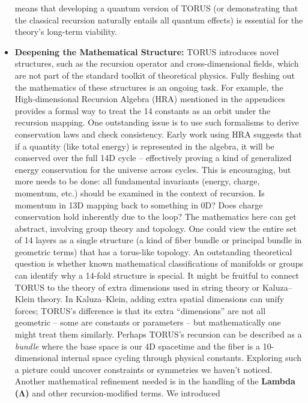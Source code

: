 \documentclass[
]{article}
\begin{document}
\begin{itemize}
  means that developing a quantum version of TORUS (or demonstrating
  that the classical recursion naturally entails all quantum effects) is
  essential for the theory's long-term viability.
\item
  \textbf{Deepening the Mathematical Structure:} TORUS introduces novel
  structures, such as the recursion operator and cross-dimensional
  fields, which are not part of the standard toolkit of theoretical
  physics. Fully fleshing out the mathematics of these structures is an
  ongoing task. For example, the High-dimensional Recursion Algebra
  (HRA) mentioned in the appendices provides a formal way to treat the
  14 constants as an orbit under the recursion mapping\hspace{0pt}. One
  outstanding issue is to use such formalisms to derive conservation
  laws and check consistency. Early work using HRA suggests that if a
  quantity (like total energy) is represented in the algebra, it will be
  conserved over the full 14D cycle\hspace{0pt} -- effectively proving a
  kind of generalized energy conservation for the universe across
  cycles. This is encouraging, but more needs to be done: all
  fundamental invariants (energy, charge, momentum, etc.) should be
  examined in the context of recursion. Is momentum in 13D mapping back
  to something in 0D? Does charge conservation hold inherently due to
  the loop? The mathematics here can get abstract, involving group
  theory and topology. One could view the entire set of 14 layers as a
  single structure (a kind of fiber bundle or principal bundle in
  geometric terms) that has a torus-like topology. An outstanding
  theoretical question is whether known mathematical classifications of
  manifolds or groups can identify why a 14-fold structure is special.
  It might be fruitful to connect TORUS to the theory of extra
  dimensions used in string theory or Kaluza--Klein theory. In
  Kaluza--Klein, adding extra spatial dimensions can unify forces;
  TORUS's difference is that its extra ``dimensions'' are not all
  geometric -- some are constants or parameters -- but mathematically
  one might treat them similarly. Perhaps TORUS's recursion can be
  described as a \emph{bundle} where the base space is our 4D spacetime
  and the fiber is a 10-dimensional internal space cycling through
  physical constants. Exploring such a picture could uncover constraints
  or symmetries we haven't noticed. Another mathematical refinement
  needed is in the handling of the \textbf{Lambda (Λ)} and other
  recursion-modified terms. We introduced

\end{itemize}
\end{document}
